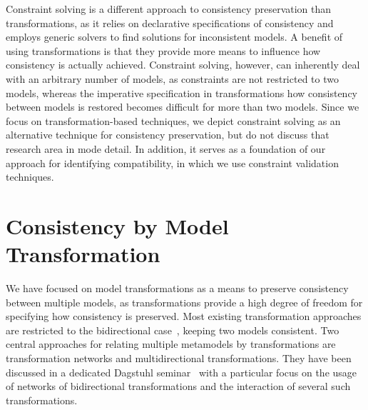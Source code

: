 Constraint solving is a different approach to consistency preservation than transformations, as it relies on declarative specifications of consistency and employs generic solvers to find solutions for inconsistent models.
A benefit of using transformations is that they provide more means to influence how consistency is actually achieved.
Constraint solving, however, can inherently deal with an arbitrary number of models, as constraints are not restricted to two models, whereas the imperative specification in transformations how consistency between models is restored becomes difficult for more than two models.
Since we focus on transformation-based techniques, we depict constraint solving as an alternative technique for consistency preservation, but do not discuss that research area in mode detail.
In addition, it serves as a foundation of our approach for identifying compatibility, in which we use constraint validation techniques.



\section{Consistency by Model Transformation}

We have focused on model transformations as a means to preserve consistency between multiple models, as transformations provide a high degree of freedom for specifying how consistency is preserved.
Most existing transformation approaches are restricted to the bidirectional case~\cite{weidmann2020ApplyingBidirectionalTransformations-WSRE, cleve2019dagstuhl}, keeping two models consistent.
Two central approaches for relating multiple metamodels by transformations are transformation networks and multidirectional transformations.
They have been discussed in a dedicated Dagstuhl seminar~\cite{cleve2019dagstuhl} with a particular focus on the usage of networks of bidirectional transformations and the interaction of several such transformations.

